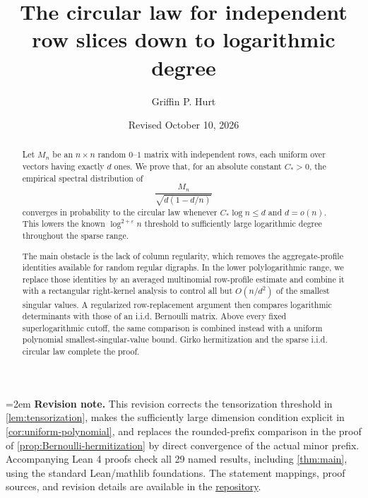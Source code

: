 \documentclass[11pt,reqno]{amsart}
\title[The circular law down to logarithmic degree]{The circular law for independent row slices down to logarithmic degree}
\author{Griffin P. Hurt}
\date{Revised October 10, 2026}
\theoremstyle{definition}
\theoremstyle{remark}
\numberwithin{equation}{section}
\newcommand{\1}{\mathbf 1}
\newcommand{\eps}{\varepsilon}
\begin{document}
\begin{abstract}
Let $M_n$ be an $n\times n$ random $0$--$1$ matrix with independent rows, each uniform over vectors having exactly $d$ ones. We prove that, for an absolute constant $C_*>0$, the empirical spectral distribution of
\[
  \frac{M_n}{\sqrt{d(1-d/n)}}
\]
converges in probability to the circular law whenever $C_*\log n\le d$ and $d=o(n)$. This lowers the known $\log^{2+\eps}n$ threshold to sufficiently large logarithmic degree throughout the sparse range.

The main obstacle is the lack of column regularity, which removes the aggregate-profile identities available for random regular digraphs. In the lower polylogarithmic range, we replace those identities by an averaged multinomial row-profile estimate and combine it with a rectangular right-kernel analysis to control all but $O(n/d^2)$ of the smallest singular values. A regularized row-replacement argument then compares logarithmic determinants with those of an i.i.d. Bernoulli matrix. Above every fixed superlogarithmic cutoff, the same comparison is combined instead with a uniform polynomial smallest-singular-value bound. Girko hermitization and the sparse i.i.d. circular law complete the proof.
\end{abstract}

\maketitle
\begingroup
\emergencystretch=2em
\noindent\textbf{Revision note.}
This revision corrects the tensorization threshold in \cref{lem:tensorization},
makes the sufficiently large dimension condition explicit in
\cref{cor:uniform-polynomial}, and replaces the rounded-prefix comparison
in the proof of \cref{prop:Bernoulli-hermitization} by direct convergence
of the actual minor prefix. Accompanying Lean 4 proofs check all 29 named
results, including \cref{thm:main}, using the standard Lean/mathlib
foundations. The statement mappings, proof sources, and revision details
are available in the \href{https://github.com/gxh2932/circular-law-independent-row-slices}{repository}.
\par
\endgroup

\tableofcontents














\end{document}

